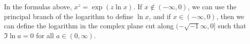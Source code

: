 \begin{rem}
In the formulas above, $x^z = \exp(z\ln{x})$. If $x \notin (-\infty, 0)$, we can use the principal branch of the logarithm to def\/ine $\ln{x}$, and if $x \in (-\infty, 0)$, then we can def\/ine the logarithm in the complex plane cut along $(-\sqrt{-1} \infty, 0]$ such that $\Im \ln{a} = 0$ for all $a \in (0, \infty)$.
\end{rem}
